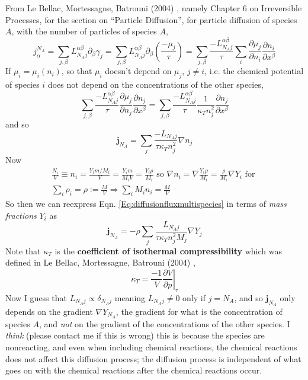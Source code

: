 \documentclass[10pt]{amsart}
\begin{document}
\begin{multicols*}{2}
From Le Bellac, Mortessagne, Batrouni (2004) \cite{MLeBellacFMortessagneGBatrouni2004}, namely Chapter 6 on Irreversible Processes, for the section on ``Particle Diffusion'', for particle diffusion of species $A$, with the number of particles of species $A$, 
\[
j_{\alpha}^{N_A} = \sum_{j,\beta} L^{\alpha \beta}_{N_A j} \partial_{\beta} \gamma_j = \sum_{j,\beta} L^{\alpha \beta}_{N_A j} \partial_{\beta} \left( \frac{-\mu_j}{\tau} \right) = \sum_{j,\beta} \frac{-L_{N_A j}^{\alpha \beta} }{ \tau } \sum_i \frac{ \partial \mu_j}{ \partial n_i} \frac{ \partial n_i}{ \partial x^{\beta} }
\]
If $\mu_i = \mu_i(n_i)$, so that $\mu_i$ doesn't depend on $\mu_j$, $j\neq i$, i.e. the chemical potential of species $i$ does not depend on the concentrations of the other species, 
\[
\sum_{j,\beta} \frac{-L_{N_A j}^{\alpha \beta} }{\tau} \frac{ \partial \mu_j}{ \partial n_j} \frac{ \partial n_j}{ \partial x^{\beta} } = \sum_{j,\beta} \frac{-L_{N_Aj}^{\alpha \beta} }{ \tau} \frac{1}{ \kappa_T n_j^2 } \frac{ \partial n_j}{ \partial x^{\beta} }
\]and so 
\begin{equation}\label{Eq:diffusionfluxmultispecies}
\mathbf{j}_{N_A} = \sum_j \frac{-L_{N_Aj} }{ \tau \kappa_T n_j^2 } \nabla n_j
\end{equation}
Now
\[
\begin{gathered}
  \frac{N_i}{V} \equiv n_i = \frac{Y_i m/M_i}{V} = \frac{Y_i m }{ M_iV} = \frac{Y_i \rho }{ M_i} \text{ so } \boxed{ \nabla n_i = \nabla \frac{Y_i \rho }{M_i} = \frac{ \rho}{ M_i} \nabla Y_i } \text{ for } \\ 
  \sum_i \rho_i = \rho := \frac{M}{V} \Longrightarrow \sum_i M_i n_i = \frac{M}{V}
\end{gathered}
\]
So then we can reexpress Eqn. \ref{Eq:diffusionfluxmultispecies} in terms of \emph{mass fractions} $Y_i$ as 
\[
\mathbf{j}_{N_A} = -\rho \sum_j \frac{L_{N_Aj}}{\tau \kappa_T n_j^2  M_j } \nabla Y_j
\]
Note that $\kappa_T$ is the \textbf{coefficient of isothermal compressibility} which was defined in Le Bellac, Mortessagne, Batrouni (2004) \cite{MLeBellacFMortessagneGBatrouni2004}, 
\[
\kappa_T = \frac{-1}{V} \left. \frac{ \partial V}{ \partial p } \right|_{\tau} 
\]
Now I guess that $L_{N_Aj} \propto \delta_{N_Aj}$ meaning $L_{N_A j} \neq 0$ only if $j = N_A$, and so $\mathbf{j}_{N_A}$ only depends on the gradient $\nabla Y_{N_A}$, the gradient for what is the concentration of species $A$, and \emph{not} on the gradient of the concentrations of the other species.  I \emph{think} (please contact me if this is wrong) this is because the species are nonreacting, and even when including chemical reactions, the chemical reactions does not affect this diffusion process; the diffusion process is independent of what goes on with the chemical reactions after the chemical reactions occur.  


\end{multicols*}
\end{document}
